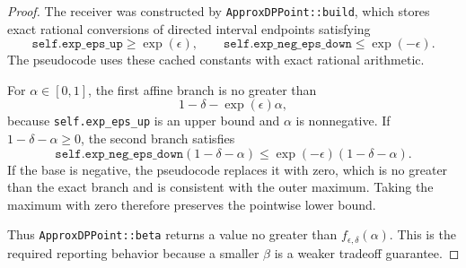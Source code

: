 \documentclass{article}
\begin{document}
\begin{proof}
The receiver was constructed by \texttt{ApproxDPPoint::build}, which stores
exact rational conversions of directed interval endpoints satisfying
\[
    \texttt{self.exp\_eps\_up} \ge \exp(\epsilon), \qquad
    \texttt{self.exp\_neg\_eps\_down} \le \exp(-\epsilon).
\]
The pseudocode uses these cached constants with exact rational arithmetic.

For $\alpha \in [0,1]$, the first affine branch is no greater than
\[
    1 - \delta - \exp(\epsilon)\alpha,
\]
because \texttt{self.exp\_eps\_up} is an upper bound and $\alpha$ is
nonnegative. If $1-\delta-\alpha \ge 0$, the second branch satisfies
\[
    \texttt{self.exp\_neg\_eps\_down}(1-\delta-\alpha)
    \le \exp(-\epsilon)(1-\delta-\alpha).
\]
If the base is negative, the pseudocode replaces it with zero, which is no
greater than the exact branch and is consistent with the outer maximum.
Taking the maximum with zero therefore preserves the pointwise lower bound.

Thus \texttt{ApproxDPPoint::beta} returns a value no greater than
$f_{\epsilon,\delta}(\alpha)$. This is the required reporting behavior
because a smaller $\beta$ is a weaker tradeoff guarantee.
\end{proof}
\end{document}
